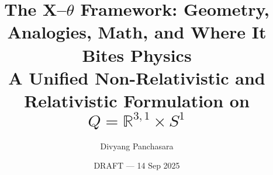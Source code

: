 \documentclass[11pt,a4paper]{article}
\title{The X–\texorpdfstring{$\theta$}{theta} Framework: Geometry, Analogies, Math, and Where It Bites Physics\\\large A Unified Non-Relativistic and Relativistic Formulation on \texorpdfstring{$Q=\mathbb{R}^{3,1}\times S^1$}{Q=R^{3,1}xS1}}
\author{Divyang Panchasara}
\date{DRAFT — 14 Sep 2025}
\begin{document}
\maketitle
\tableofcontents
\clearpage

















\appendix



\clearpage
\nocite{*}


\end{document}
